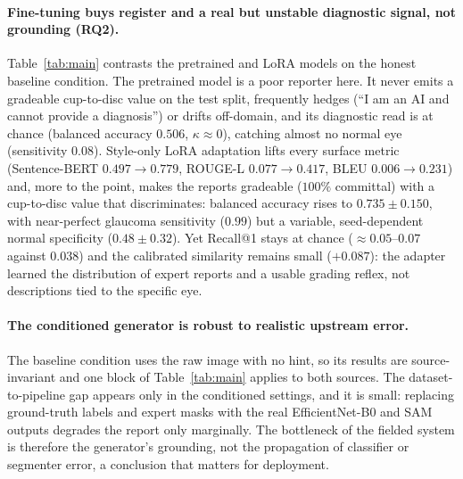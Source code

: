\documentclass[runningheads]{llncs}
\begin{document}
\paragraph{Fine-tuning buys register and a real but unstable diagnostic signal, not grounding (RQ2).}
Table~\ref{tab:main} contrasts the pretrained and LoRA models on the honest baseline condition. The pretrained model is a poor reporter here. It never emits a gradeable cup-to-disc value on the test split, frequently hedges (``I am an AI and cannot provide a diagnosis'') or drifts off-domain, and its diagnostic read is at chance (balanced accuracy $0.506$, $\kappa\approx0$), catching almost no normal eye (sensitivity $0.08$). Style-only LoRA adaptation lifts every surface metric (Sentence-BERT $0.497\to0.779$, ROUGE-L $0.077\to0.417$, BLEU $0.006\to0.231$) and, more to the point, makes the reports gradeable ($100\%$ committal) with a cup-to-disc value that discriminates: balanced accuracy rises to $0.735\pm0.150$, with near-perfect glaucoma sensitivity ($0.99$) but a variable, seed-dependent normal specificity ($0.48\pm0.32$). Yet Recall@1 stays at chance ($\approx0.05$--$0.07$ against $0.038$) and the calibrated similarity remains small ($+0.087$): the adapter learned the distribution of expert reports and a usable grading reflex, not descriptions tied to the specific eye.

\paragraph{The conditioned generator is robust to realistic upstream error.}
The baseline condition uses the raw image with no hint, so its results are source-invariant and one block of Table~\ref{tab:main} applies to both sources. The dataset-to-pipeline gap appears only in the conditioned settings, and it is small: replacing ground-truth labels and expert masks with the real EfficientNet-B0 and SAM outputs degrades the report only marginally. The bottleneck of the fielded system is therefore the generator's grounding, not the propagation of classifier or segmenter error, a conclusion that matters for deployment.
\end{document}
